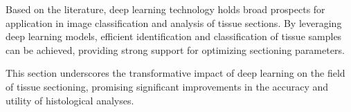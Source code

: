 Based on the literature, deep learning technology holds broad prospects for application in image classification and analysis of tissue sections. By leveraging deep learning models, efficient identification and classification of tissue samples can be achieved, providing strong support for optimizing sectioning parameters.

This section underscores the transformative impact of deep learning on the field of tissue sectioning, promising significant improvements in the accuracy and utility of histological analyses.








